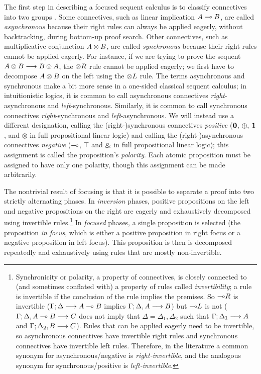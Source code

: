 The first step in describing a focused sequent calculus is to classify
connectives into two groups \cite{andreoli92logic}.  Some connectives,
such as linear implication $A \multimap B$, are called {\it asynchronous}
because their right rules can always be applied eagerly, without
backtracking, during bottom-up proof search. Other connectives, such
as multiplicative conjunction $A \otimes B$, are called {\it
  synchronous} because their right rules cannot be applied
eagerly. For instance, if we are trying to prove the sequent $A
\otimes B \longrightarrow B \otimes A$, the ${\otimes}R$ rule cannot
be applied eagerly; we first have to decompose $A \otimes B$ on the
left using the ${\otimes}L$ rule.  The terms asynchronous and
synchronous make a bit more sense in a one-sided classical sequent
calculus; in intuitionistic logics, it is common to call asynchronous
connectives {\it right}-asynchronous and {\it
  left}-synchronous. Similarly, it is common to call synchronous
connectives {\it right}-synchronous and {\it left}-asynchronous.  We
will instead use a different designation, calling the
(right-)synchronous connectives {\it positive} ($\mathbf{0}$, $\oplus$,
$\mathbf{1}$, and $\otimes$ in full propositional linear logic) and calling
the (right-)asynchronous connectives {\it negative} ($\multimap$, $\top$
and $\mathbin{\binampersand}$ in full propositional linear logic); this assignment is
called the proposition's {\it polarity}. Each atomic proposition must
be assigned to have only one polarity, though this assignment can be
made arbitrarily.

The nontrivial result of focusing is that it is possible to separate a
proof into two strictly alternating phases. In {\it inversion} phases,
positive propositions on the left and negative propositions on the
right are eagerly and exhaustively decomposed using invertible
rules.\footnote{Synchronicity or polarity, a property of connectives,
  is closely connected to (and sometimes conflated with) a property of
  rules called {\it invertibility}; a rule is invertible if the
  conclusion of the rule implies the premises. So ${\multimap}R$ is
  invertible (${\Gamma};{\Delta} \longrightarrow {A \multimap B} \mathstrut$ implies
  ${\Gamma};{\Delta, A} \longrightarrow {B} \mathstrut$) but ${\multimap}L$ is not
  (${\Gamma};{\Delta, A \multimap B} \longrightarrow {C} \mathstrut$ does not imply that $\Delta =
  \Delta_1, \Delta_2$ such that ${\Gamma};{\Delta_1} \longrightarrow {A} \mathstrut$ and
  ${\Gamma};{\Delta_2, B} \longrightarrow {C} \mathstrut$).  Rules that can be applied eagerly
  need to be invertible, so asynchronous connectives have invertible
  right rules and synchronous connectives have invertible left
  rules. Therefore, in the literature a common synonym for
  asynchronous/negative is {\it right-invertible}, and the analogous
  synonym for synchronous/positive is {\it left-invertible}.}  In {\it
  focused} phases, a single proposition is selected (the proposition
{\it in focus}, which is either a positive proposition in right focus
or a negative proposition in left focus). This
proposition is then is decomposed repeatedly and
exhaustively using rules that are mostly non-invertible.

